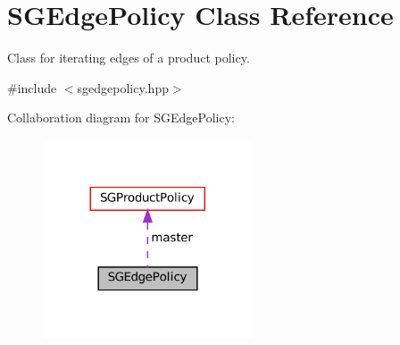 \hypertarget{classSGEdgePolicy}{}\section{S\+G\+Edge\+Policy Class Reference}
\label{classSGEdgePolicy}


Class for iterating edges of a product policy.  




{\ttfamily \#include $<$sgedgepolicy.\+hpp$>$}



Collaboration diagram for S\+G\+Edge\+Policy\+:
\nopagebreak
\begin{figure}[H]
\begin{center}
\leavevmode
\includegraphics[width=176pt]{classSGEdgePolicy__coll__graph}
\end{center}
\end{figure}
